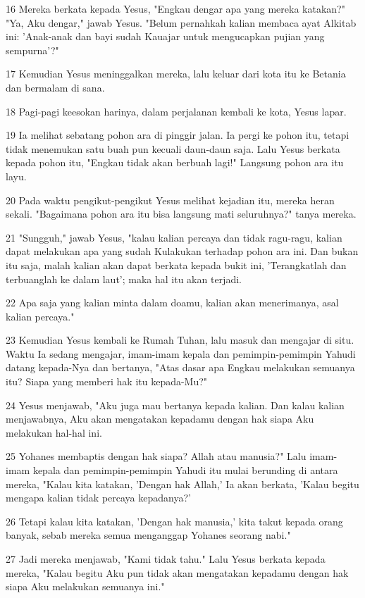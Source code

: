 \par 16 Mereka berkata kepada Yesus, "Engkau dengar apa yang mereka katakan?" "Ya, Aku dengar," jawab Yesus. "Belum pernahkah kalian membaca ayat Alkitab ini: 'Anak-anak dan bayi sudah Kauajar untuk mengucapkan pujian yang sempurna'?"
\par 17 Kemudian Yesus meninggalkan mereka, lalu keluar dari kota itu ke Betania dan bermalam di sana.
\par 18 Pagi-pagi keesokan harinya, dalam perjalanan kembali ke kota, Yesus lapar.
\par 19 Ia melihat sebatang pohon ara di pinggir jalan. Ia pergi ke pohon itu, tetapi tidak menemukan satu buah pun kecuali daun-daun saja. Lalu Yesus berkata kepada pohon itu, "Engkau tidak akan berbuah lagi!" Langsung pohon ara itu layu.
\par 20 Pada waktu pengikut-pengikut Yesus melihat kejadian itu, mereka heran sekali. "Bagaimana pohon ara itu bisa langsung mati seluruhnya?" tanya mereka.
\par 21 "Sungguh," jawab Yesus, "kalau kalian percaya dan tidak ragu-ragu, kalian dapat melakukan apa yang sudah Kulakukan terhadap pohon ara ini. Dan bukan itu saja, malah kalian akan dapat berkata kepada bukit ini, 'Terangkatlah dan terbuanglah ke dalam laut'; maka hal itu akan terjadi.
\par 22 Apa saja yang kalian minta dalam doamu, kalian akan menerimanya, asal kalian percaya."
\par 23 Kemudian Yesus kembali ke Rumah Tuhan, lalu masuk dan mengajar di situ. Waktu Ia sedang mengajar, imam-imam kepala dan pemimpin-pemimpin Yahudi datang kepada-Nya dan bertanya, "Atas dasar apa Engkau melakukan semuanya itu? Siapa yang memberi hak itu kepada-Mu?"
\par 24 Yesus menjawab, "Aku juga mau bertanya kepada kalian. Dan kalau kalian menjawabnya, Aku akan mengatakan kepadamu dengan hak siapa Aku melakukan hal-hal ini.
\par 25 Yohanes membaptis dengan hak siapa? Allah atau manusia?" Lalu imam-imam kepala dan pemimpin-pemimpin Yahudi itu mulai berunding di antara mereka, "Kalau kita katakan, 'Dengan hak Allah,' Ia akan berkata, 'Kalau begitu mengapa kalian tidak percaya kepadanya?'
\par 26 Tetapi kalau kita katakan, 'Dengan hak manusia,' kita takut kepada orang banyak, sebab mereka semua menganggap Yohanes seorang nabi."
\par 27 Jadi mereka menjawab, "Kami tidak tahu." Lalu Yesus berkata kepada mereka, "Kalau begitu Aku pun tidak akan mengatakan kepadamu dengan hak siapa Aku melakukan semuanya ini."
